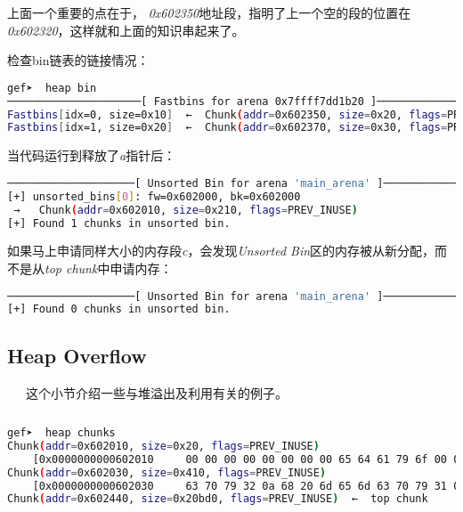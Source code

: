 \documentclass[12pt]{article}  %
\begin{document}
上面一个重要的点在于， \emph{0x602350}地址段，指明了上一个空的段的位置在\emph{0x602320}，这样就和上面的知识串起来了。\par
检查bin链表的链接情况：
\begin{lstlisting}[language=sh]
gef➤  heap bin
─────────────────────[ Fastbins for arena 0x7ffff7dd1b20 ]─────────────────────
Fastbins[idx=0, size=0x10]  ←  Chunk(addr=0x602350, size=0x20, flags=PREV_INUSE)  ←  Chunk(addr=0x602330, size=0x20, flags=PREV_INUSE) 
Fastbins[idx=1, size=0x20]  ←  Chunk(addr=0x602370, size=0x30, flags=PREV_INUSE) 
\end{lstlisting}\par
当代码运行到释放了\emph{a}指针后：
\begin{lstlisting}[language=sh]
────────────────────[ Unsorted Bin for arena 'main_arena' ]────────────────────
[+] unsorted_bins[0]: fw=0x602000, bk=0x602000
 →   Chunk(addr=0x602010, size=0x210, flags=PREV_INUSE)
[+] Found 1 chunks in unsorted bin.
\end{lstlisting}\par
如果马上申请同样大小的内存段\emph{c}，会发现\emph{Unsorted Bin}区的内存被从新分配，而不是从\emph{top chunk}中申请内存：
\begin{lstlisting}[language=sh]
────────────────────[ Unsorted Bin for arena 'main_arena' ]────────────────────
[+] Found 0 chunks in unsorted bin.

\end{lstlisting}\par

\subsection{Heap Overflow}
\ \ \ 这个小节介绍一些与堆溢出及利用有关的例子。
\begin{lstlisting}[language=sh]

\end{lstlisting}

\begin{lstlisting}[language=sh]
gef➤  heap chunks
Chunk(addr=0x602010, size=0x20, flags=PREV_INUSE)
    [0x0000000000602010     00 00 00 00 00 00 00 00 65 64 61 79 6f 00 00 00     ........edayo...]
Chunk(addr=0x602030, size=0x410, flags=PREV_INUSE)
    [0x0000000000602030     63 70 79 32 0a 68 20 6d 65 6d 63 70 79 31 0a 00     cpy2.h memcpy1..]
Chunk(addr=0x602440, size=0x20bd0, flags=PREV_INUSE)  ←  top chunk

\end{lstlisting}
\end{document}
